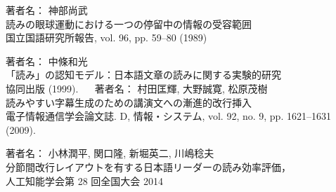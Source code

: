 
\begin{bib}[100]

\begin{thebibliography}{}

     \newblock  著者名： 神部尚武
   　\newblock \\読みの眼球運動における一つの停留中の情報の受容範囲
   　\newblock \\国立国語研究所報告, vol. 96, pp. 59–80 (1989)

   \newblock  著者名： 中條和光
 　\newblock \\「読み」の認知モデル：日本語文章の読みに関する実験的研究
 　\newblock \\ 協同出版 (1999).
  　
    \newblock  著者名： 村田匡輝, 大野誠寛, 松原茂樹
  　\newblock \\読みやすい字幕生成のための講演文への漸進的改行挿入
  　\newblock \\電子情報通信学会論文誌. D, 情報・システム, vol. 92, no. 9, pp. 1621–1631 (2009).

    \newblock  著者名： 小林潤平, 関口隆, 新堀英二, 川嶋稔夫
    \newblock \\分節間改行レイアウトを有する日本語リーダーの読み効率評価，
    \newblock \\人工知能学会第 28 回全国大会 2014 
\end{thebibliography}

\end{bib}
